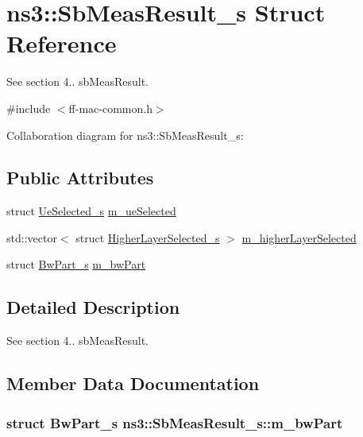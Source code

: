 \hypertarget{structns3_1_1SbMeasResult__s}{}\section{ns3\+:\+:Sb\+Meas\+Result\+\_\+s Struct Reference}
\label{structns3_1_1SbMeasResult__s}


See section 4.. sb\+Meas\+Result.  




{\ttfamily \#include $<$ff-\/mac-\/common.\+h$>$}



Collaboration diagram for ns3\+:\+:Sb\+Meas\+Result\+\_\+s\+:
\subsection*{Public Attributes}
\begin{DoxyCompactItemize}
\item 
struct \hyperlink{structns3_1_1UeSelected__s}{Ue\+Selected\+\_\+s} \hyperlink{structns3_1_1SbMeasResult__s_a7d5fff638d046728b909d37bf5d1ec3d}{m\+\_\+ue\+Selected}
\item 
std\+::vector$<$ struct \hyperlink{structns3_1_1HigherLayerSelected__s}{Higher\+Layer\+Selected\+\_\+s} $>$ \hyperlink{structns3_1_1SbMeasResult__s_a0a75139e3d23967f1826732960b1928a}{m\+\_\+higher\+Layer\+Selected}
\item 
struct \hyperlink{structns3_1_1BwPart__s}{Bw\+Part\+\_\+s} \hyperlink{structns3_1_1SbMeasResult__s_a447393fffc8347a677cce6b6b8ec40ea}{m\+\_\+bw\+Part}
\end{DoxyCompactItemize}


\subsection{Detailed Description}
See section 4.. sb\+Meas\+Result. 

\subsection{Member Data Documentation}
\subsubsection[{\texorpdfstring{m\+\_\+bw\+Part}{m_bwPart}}]{\setlength{\rightskip}{0pt plus 5cm}struct {\bf Bw\+Part\+\_\+s} ns3\+::\+Sb\+Meas\+Result\+\_\+s\+::m\+\_\+bw\+Part}\hypertarget{structns3_1_1SbMeasResult__s_a447393fffc8347a677cce6b6b8ec40ea}{}\label{structns3_1_1SbMeasResult__s_a447393fffc8347a677cce6b6b8ec40ea}
